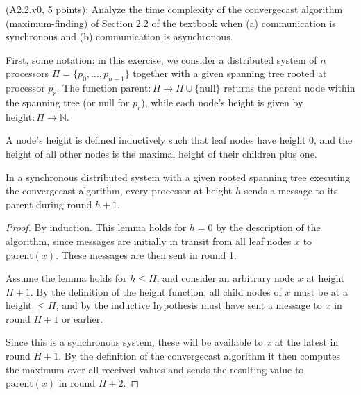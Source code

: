 \begin{Exc}{(A2.2.v0, 5 points):}
Analyze the time complexity of the convergecast algorithm
(maximum-finding) of Section 2.2 of the textbook when (a) communication is
synchronous and (b) communication is asynchronous.
\end{Exc}

\begin{comment}
Hint: For the synchronous case, prove that during round t + 1, a processor at
height t sends a message to its parent. For the asynchronous case, prove that
by time t, a processor at height t has sent a message to its parent.
\end{comment}


\newcommand{\prnt}[1]{\text{parent}(#1)}
\newcommand{\hght}[1]{\text{height}(#1)}

First, some notation: in this exercise, we consider a distributed system of $n$
processors $\Pi=\{p_0,\dots,p_{n-1}\}$ together with a given spanning tree
rooted at processor $p_r$. The function
$\text{parent}: \Pi \rightarrow \Pi \cup \{ \text{null} \}$ returns the parent node
within the spanning tree (or null for $p_r$), while each node's height is given by
$\text{height}: \Pi \rightarrow \mathbb{N}$.

\begin{definition}
A node's height is defined inductively such that leaf nodes have height 0,
and the height of all other nodes is the maximal height of their children plus one.
\end{definition}


\begin{lemma} \label{lemma:1sync}
In a synchronous distributed system with a given rooted spanning tree executing the convergecast
algorithm, every processor at height $h$ sends a message to its parent during round $h + 1$.
\end{lemma}

\begin{proof}
By induction. This lemma holds for $h = 0$ by the description of the algorithm, since
messages are initially in transit from all leaf nodes $x$ to $\prnt{x}$. These messages
are then sent in round 1.

Assume the lemma holds for $h \leq H$, and consider an arbitrary node $x$ at height
$H + 1$. By the definition of the height function, all child nodes of $x$ must be at
a height $\leq H$, and by the inductive hypothesis must have sent a message to
$x$ in round $H + 1$ or earlier.

Since this is a synchronous system, these will be available
to $x$ at the latest in round $H + 1$. By the definition of the
convergecast algorithm it then computes the maximum over all received values and
sends the resulting value to $\prnt{x}$ in round $H + 2$.
\end{proof}

